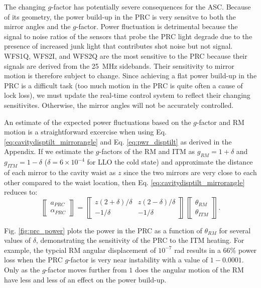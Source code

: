 The changing $g$-factor has potentially severe consequences for the
ASC. Because of its geometry, the power build-up in the PRC is very
sensitve to both the mirror angles and the $g$-factor. Power
fluctuation is detrimental because the signal to noise ratios of the
sensors that probe the PRC light degrade due to the presence of
increased junk light that contributes shot noise but not
signal. WFS1Q, WFS2I, and WFS2Q are the most sensitive to the PRC
because their signals are derived from the 25~MHz sidebands. Their
sensitivity to mirror motion is therefore subject to change. Since
achieving a flat power build-up in the PRC is a difficult task (too
much motion in the PRC is quite often a cause of lock loss), we must
update the real-time control system to reflect their changing
sensitivites. Otherwise, the mirror angles will not be accurately
controlled.

An estimate of the expected power fluctuations based on the $g$-factor
and RM motion is a straightforward excercise when using
Eq. \ref{eq:cavitydisptilt_mirrorangle} and Eq. \ref{eq:pwr_disptilt}
as derived in the Appendix. If we estimate the $g$-factors of the RM
and ITM as $g_{RM} = 1+\delta$ and $g_{ITM} = 1 - \delta$ ($\delta =6
\times 10^{-4}$ for LLO the cold state) and approximate the distance
of each mirror to the cavity waist as $z$ since the two mirrors are
very close to each other compared to the waist location, then
Eq. \ref{eq:cavitydisptilt_mirrorangle} reduces to:
\begin{equation}
\left\llbracket \begin{array}{c}
a_{PRC} \\
\alpha_{PRC} \end{array} \right\rrbracket = 
\left\llbracket \begin{array}{cc}
z(2+\delta)/\delta & z(2-\delta)/\delta \\
-1/\delta & -1/\delta \end{array} \right\rrbracket
\left\llbracket \begin{array}{c}
\theta_{RM}\\
\theta_{ITM} \end{array} \right\rrbracket.
\end{equation}

Fig. \ref{fig:prc_power} plots the power in the PRC as a function of
$\theta_{RM}$ for several values of $\delta$, demonstrating
the sensitivity of the PRC to the ITM heating.  For example, the
typcial RM angular displacement of $10^{-7}$ rad results in a 66\%
power loss when the PRC $g$-factor is very near instability with a
value of $1-0.0001$. Only as the $g$-factor moves further from $1$
does the angular motion of the RM have less and less of an effect on
the power build-up.

